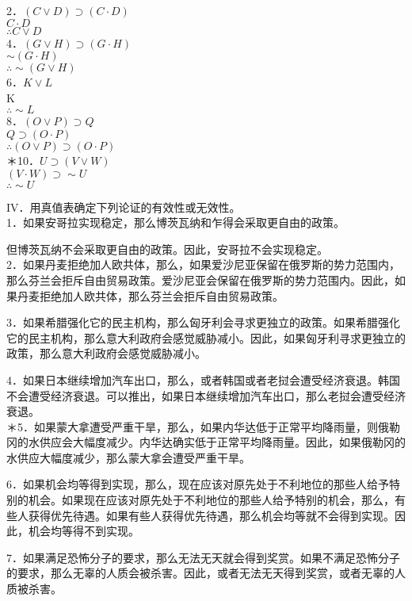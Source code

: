 2．$(C \vee D) \supset(C \cdot D)$\\
$C \cdot D$\\
$\therefore C \vee D$\\
4．$(G \vee H) \supset(G \cdot H)$\\
$\sim(G \cdot H)$\\
$\therefore \sim(G \vee H)$\\
6．$K \vee L$\\
K\\
$\therefore \sim L$\\
8．$(O \vee P) \supset Q$\\
$Q \supset(O \cdot P)$\\
$\therefore(O \vee P) \supset(O \cdot P)$\\
＊10．$U \supset(V \vee W)$\\
$(V \cdot W) \supset \sim U$\\
$\therefore \sim U$

IV．用真值表确定下列论证的有效性或无效性。\\
1．如果安哥拉实现稳定，那么博茨瓦纳和乍得会采取更自由的政策。

但博茨瓦纳不会采取更自由的政策。因此，安哥拉不会实现稳定。\\
2．如果丹麦拒绝加人欧共体，那么，如果爱沙尼亚保留在俄罗斯的势力范围内，那么芬兰会拒斥自由贸易政策。爱沙尼亚会保留在俄罗斯的势力范围内。因此，如果丹麦拒绝加人欧共体，那么芬兰会拒斥自由贸易政策。

3．如果希腊强化它的民主机构，那么匈牙利会寻求更独立的政策。如果希腊强化它的民主机构，那么意大利政府会感觉威胁减小。因此，如果匈牙利寻求更独立的政策，那么意大利政府会感觉威胁减小。

4．如果日本继续增加汽车出口，那么，或者韩国或者老挝会遭受经济衰退。韩国不会遭受经济衰退。可以推出，如果日本继续增加汽车出口，那么老挝会遭受经济衰退。\\
＊5．如果蒙大拿遭受严重干旱，那么，如果内华达低于正常平均降雨量，则俄勒冈的水供应会大幅度减少。内华达确实低于正常平均降雨量。因此，如果俄勒冈的水供应大幅度减少，那么蒙大拿会遭受严重干旱。

6．如果机会均等得到实现，那么，现在应该对原先处于不利地位的那些人给予特别的机会。如果现在应该对原先处于不利地位的那些人给予特别的机会，那么，有些人获得优先待遇。如果有些人获得优先待遇，那么机会均等就不会得到实现。因此，机会均等得不到实现。

7．如果满足恐怖分子的要求，那么无法无天就会得到奖赏。如果不满足恐怖分子的要求，那么无辜的人质会被杀害。因此，或者无法无天得到奖赏，或者无辜的人质被杀害。

